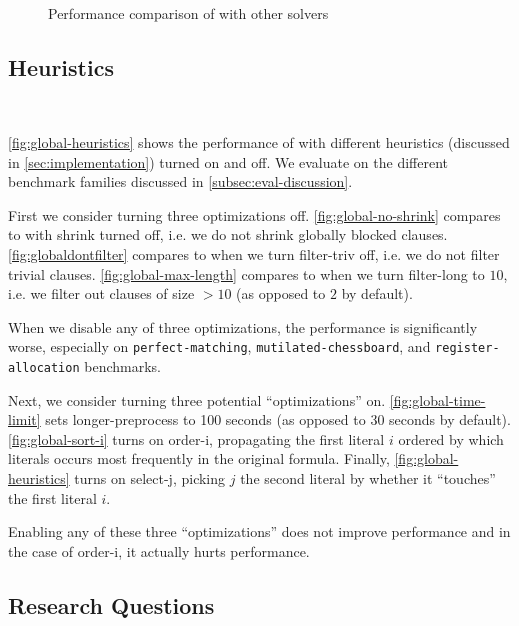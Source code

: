 \begin{figure}[!ht]
    \centering
    
    \caption{Performance comparison of \tool with other
    solvers}~\label{fig:global-heuristics}
\end{figure}



\subsection{Heuristics}~\label{sec:heuristics}

\autoref{fig:global-heuristics} shows the performance of \tool with different
heuristics (discussed in \autoref{sec:implementation}) turned on and off. We
evaluate on the different benchmark families discussed in
\autoref{subsec:eval-discussion}.

First we consider turning three optimizations off.
\autoref{fig:global-no-shrink} compares \cadical to \cadical with
\textsf{shrink} turned off, i.e. we do not shrink globally blocked clauses.
\autoref{fig:globaldontfilter} compares \cadical to when we turn
\textsf{filter-triv} off, i.e. we do not filter trivial clauses.
\autoref{fig:global-max-length} compares \cadical to when we turn
\textsf{filter-long} to $10$, i.e. we filter out clauses of size $> 10$ (as opposed to $2$ by default).

When we disable any of three optimizations, the performance is significantly
worse, especially on \texttt{perfect-matching}, \texttt{mutilated-chessboard},
and \texttt{register-allocation} benchmarks.

Next, we consider turning three potential ``optimizations'' on.
\autoref{fig:global-time-limit} sets \textsf{longer-preprocess} to 100 seconds (as opposed to 30 seconds by default).
\autoref{fig:global-sort-i} turns on \textsf{order-i}, propagating the first literal $i$ 
ordered by which literals occurs most frequently in the original formula.
Finally, \autoref{fig:global-heuristics} turns on \textsf{select-j}, picking $j$
the second literal by whether it ``touches'' the first literal $i$.

Enabling any of these three ``optimizations'' does not improve performance and in the 
case of \textsf{order-i}, it actually hurts performance.

\subsection{Research Questions}~\label{subsec:researchquestions}

